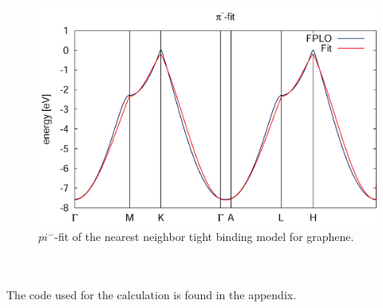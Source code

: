 		\begin{figure}[h]
			\centering
			\includegraphics[width=1\textwidth]{Results/Figures/piMinusFit.png}
			\caption{$pi^-$-fit of the nearest neighbor tight binding model for graphene.}
			\label{fig:piMinusFit}
		\end{figure} \\\\
		The code used for the calculation is found in the appendix. 
		
		
	
 
		
	
	
	
	